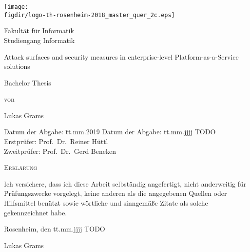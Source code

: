 \begin{titlepage}

\sffamily

\raggedleft

\vspace*{-2cm}

\texttt{[image: \\figdir/logo-th-rosenheim-2018\_master\_quer\_2c.eps]}

\vfill

\centering
\LARGE
Fakultät für Informatik  \vspace{0.5cm}\\
\Large
Studiengang Informatik

\vspace{2cm}

\LARGE

Attack surfaces and security measures in enterprise-level Platform-as-a-Service solutions

\vspace{2cm}

\Large
Bachelor Thesis

\vspace{1.5cm}


\Large
von

\vspace{0.5cm}


\LARGE
Lukas Grams

\vspace{1cm}

\vspace{1cm}

\flushleft
 \Large
\vspace*{\fill}

\begin{tabbing}
Datum der Abgabe: \= tt.mm.2019 \kill
Datum der Abgabe: \> tt.mm.jjjj TODO \\
Erstprüfer: \> Prof.\ Dr.\ Reiner Hüttl\\
Zweitprüfer: \> Prof.\ Dr.\ Gerd Beneken
\end{tabbing}

\end{titlepage}

\cleardoubleemptypage

{
\large
\thispagestyle{empty}
\vspace*{\fill}

\noindent
\textsc{Erklärung}

\medskip

\noindent
Ich versichere, dass ich diese Arbeit selbständig
angefertigt, nicht anderweitig für Prüfungszwecke
vorgelegt, keine anderen als die angegebenen Quellen
oder Hilfsmittel benützt sowie wörtliche und
sinngemäße Zitate als solche gekennzeichnet habe.

\bigskip

\noindent
Rosenheim, den tt.mm.jjjj TODO

\vspace*{2cm}

\noindent
Lukas Grams
}

